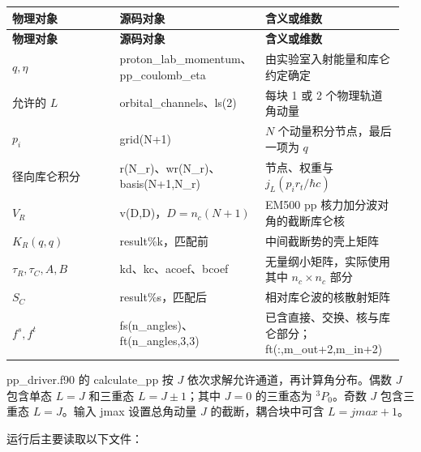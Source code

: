 \documentclass[UTF8,a4paper,zihao=5,fontset=fandol]{ctexart}
\begin{document}
{\small\setlength{\tabcolsep}{3pt}\renewcommand{\arraystretch}{1.28}
\begin{longtable}{@{}>{\raggedright\arraybackslash}p{0.2784\linewidth}>{\raggedright\arraybackslash}p{0.3264\linewidth}>{\raggedright\arraybackslash}p{0.3552\linewidth}@{}}\toprule
\textbf{物理对象} & \textbf{源码对象} & \textbf{含义或维数}\\\midrule
\endfirsthead
\textbf{物理对象} & \textbf{源码对象} & \textbf{含义或维数}\\\midrule
\endhead
\(q,\eta\) & {\ttfamily\small proton\_\allowbreak{}lab\_\allowbreak{}momentum}、{\ttfamily\small pp\_\allowbreak{}coulomb\_\allowbreak{}eta} & 由实验室入射能量和库仑约定确定\\
允许的 \(L\) & {\ttfamily\small orbital\_\allowbreak{}channels}、{\ttfamily\small ls(2)} & 每块 1 或 2 个物理轨道角动量\\
\(p_i\) & {\ttfamily\small grid(N+1)} & \(N\) 个动量积分节点，最后一项为 \(q\)\\
径向库仑积分 & {\ttfamily\small r(N\_\allowbreak{}r)}、{\ttfamily\small wr(N\_\allowbreak{}r)}、{\ttfamily\small basis(N+1,N\_\allowbreak{}r)} & 节点、权重与 \(j_L(p_ir_t/\hbar c)\)\\
\(V_R\) & {\ttfamily\small v(D,D)}，\(D=n_c(N+1)\) & EM500 pp 核力加分波对角的截断库仑核\\
\(K_R(q,q)\) & {\ttfamily\small result\%k}，匹配前 & 中间截断势的壳上矩阵\\
\(\tau_R,\tau_C,A,B\) & {\ttfamily\small kd}、{\ttfamily\small kc}、{\ttfamily\small acoef}、{\ttfamily\small bcoef} & 无量纲小矩阵，实际使用其中 \(n_c\times n_c\) 部分\\
\(S_C\) & {\ttfamily\small result\%s}，匹配后 & 相对库仑波的核散射矩阵\\
\(f^s,f^t\) & {\ttfamily\small fs(n\_\allowbreak{}angles)}、{\ttfamily\small ft(n\_\allowbreak{}angles,3,3)} & 已含直接、交换、核与库仑部分；{\ttfamily\small ft(:,m\_\allowbreak{}out+2,m\_\allowbreak{}in+2)}\\
\bottomrule\end{longtable}}
{\ttfamily\small pp\_\allowbreak{}driver.\allowbreak{}f90} 的 {\ttfamily\small calculate\_\allowbreak{}pp} 按 \(J\) 依次求解允许通道，再计算角分布。偶数 \(J\) 包含单态 \(L=J\) 和三重态 \(L=J\pm1\)；其中 \(J=0\) 的三重态为 \({}^3P_0\)。奇数 \(J\) 包含三重态 \(L=J\)。输入 {\ttfamily\small jmax} 设置总角动量 \(J\) 的截断，耦合块中可含 \(L=jmax+1\)。

运行后主要读取以下文件：
\end{document}
